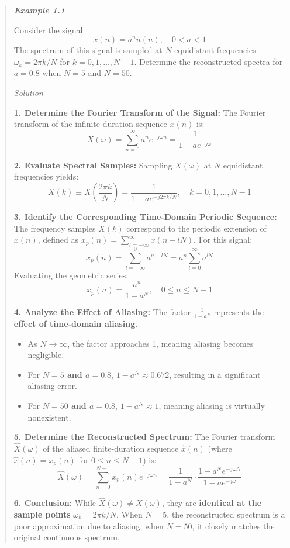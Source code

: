 \begin{quote}
\textbf{\emph{Example 1.1}}

Consider the signal \[x(n) = a^n u(n), \quad 0 < a < 1\] The spectrum of
this signal is sampled at \(N\) equidistant frequencies
\(\omega_k = 2\pi k/N\) for \(k = 0, 1, \dots, N-1\). Determine the
reconstructed spectra for \(a = 0.8\) when \(N = 5\) and \(N = 50\).

\emph{Solution}

\textbf{1. Determine the Fourier Transform of the Signal:} The Fourier
transform of the infinite-duration sequence \(x(n)\) is:
\[X(\omega) = \sum_{n=0}^{\infty} a^n e^{-j\omega n} = \frac{1}{1 - ae^{-j\omega}}\]

\textbf{2. Evaluate Spectral Samples:} Sampling \(X(\omega)\) at \(N\)
equidistant frequencies yields:
\[X(k) \equiv X\left(\frac{2\pi k}{N}\right) = \frac{1}{1 - ae^{-j2\pi k/N}}, \quad k = 0, 1, \dots, N-1\]

\textbf{3. Identify the Corresponding Time-Domain Periodic Sequence:}
The frequency samples \(X(k)\) correspond to the periodic extension of
\(x(n)\), defined as \(x_p(n) = \sum_{l=-\infty}^{\infty} x(n-lN)\). For
this signal:
\[x_p(n) = \sum_{l=-\infty}^{0} a^{n-lN} = a^n \sum_{l=0}^{\infty} a^{lN}\]
Evaluating the geometric series:
\[x_p(n) = \frac{a^n}{1 - a^N}, \quad 0 \le n \le N-1\]

\textbf{4. Analyze the Effect of Aliasing:} The factor
\(\frac{1}{1 - a^N}\) represents the \textbf{effect of time-domain
aliasing}.

\begin{itemize}
\tightlist
\item
  As \(N \rightarrow \infty\), the factor approaches 1, meaning aliasing
  becomes negligible.
\item
  For \textbf{\(N = 5\) and \(a = 0.8\)}, \(1 - a^N \approx 0.672\),
  resulting in a significant aliasing error.
\item
  For \textbf{\(N = 50\) and \(a = 0.8\)}, \(1 - a^N \approx 1\),
  meaning aliasing is virtually nonexistent.
\end{itemize}

\textbf{5. Determine the Reconstructed Spectrum:} The Fourier transform
\(\hat{X}(\omega)\) of the aliased finite-duration sequence
\(\hat{x}(n)\) (where \(\hat{x}(n) = x_p(n)\) for \(0 \le n \le N-1\))
is:
\[\hat{X}(\omega) = \sum_{n=0}^{N-1} x_p(n) e^{-j\omega n} = \frac{1}{1 - a^N} \cdot \frac{1 - a^N e^{-j\omega N}}{1 - ae^{-j\omega}}\]

\textbf{6. Conclusion:} While \(\hat{X}(\omega) \neq X(\omega)\), they
are \textbf{identical at the sample points} \(\omega_k = 2\pi k/N\).
When \(N=5\), the reconstructed spectrum is a poor approximation due to
aliasing; when \(N=50\), it closely matches the original continuous
spectrum.
\end{quote}

